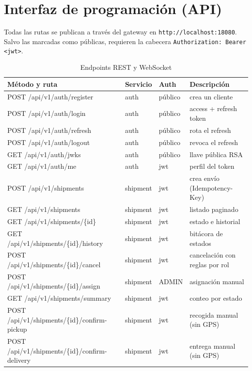 \documentclass[conference]{IEEEtran}
\newcommand{\pkg}[1]{\texttt{#1}}
\begin{document}
\clearpage
\section{Interfaz de programación (API)}

Todas las rutas se publican a través del gateway en \pkg{http://localhost:18080}. Salvo las
marcadas como públicas, requieren la cabecera \pkg{Authorization: Bearer <jwt>}.

\begin{table}[!t]
\centering
\caption{Endpoints REST y WebSocket}
\label{tab:api}
\begin{tabular}{@{}L{6.4cm}L{2.2cm}L{1.6cm}L{5.2cm}@{}}
\toprule
\textbf{Método y ruta} & \textbf{Servicio} & \textbf{Auth} & \textbf{Descripción}\\
\midrule
POST /api/v1/auth/register & auth & público & crea un cliente\\
POST /api/v1/auth/login & auth & público & access + refresh token\\
POST /api/v1/auth/refresh & auth & público & rota el refresh\\
POST /api/v1/auth/logout & auth & público & revoca el refresh\\
GET /api/v1/auth/jwks & auth & público & llave pública RSA\\
GET /api/v1/auth/me & auth & jwt & perfil del token\\
POST /api/v1/shipments & shipment & jwt & crea envío (Idempotency-Key)\\
GET /api/v1/shipments & shipment & jwt & listado paginado\\
GET /api/v1/shipments/\{id\} & shipment & jwt & estado e historial\\
GET /api/v1/shipments/\{id\}/history & shipment & jwt & bitácora de estados\\
POST /api/v1/shipments/\{id\}/cancel & shipment & jwt & cancelación con reglas por rol\\
POST /api/v1/shipments/\{id\}/assign & shipment & ADMIN & asignación manual\\
GET /api/v1/shipments/summary & shipment & jwt & conteo por estado\\
POST /api/v1/shipments/\{id\}/confirm-pickup & shipment & jwt & recogida manual (sin GPS)\\
POST /api/v1/shipments/\{id\}/confirm-delivery & shipment & jwt & entrega manual (sin GPS)\\

\end{tabular}
\end{table}
\end{document}
